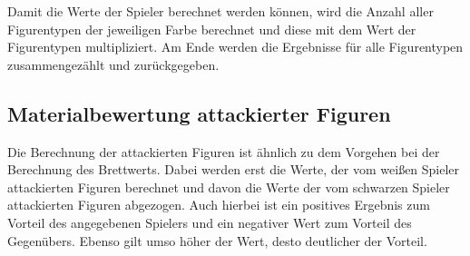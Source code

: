 Damit die Werte der Spieler berechnet werden können, wird die Anzahl
aller Figurentypen der jeweiligen Farbe berechnet und diese mit dem Wert
der Figurentypen multipliziert. Am Ende werden die Ergebnisse für alle
Figurentypen zusammengezählt und zurückgegeben.

    \subsection{Materialbewertung attackierter
Figuren}\label{materialbewertung-attackierter-figuren}

Die Berechnung der attackierten Figuren ist ähnlich zu dem Vorgehen bei
der Berechnung des Brettwerts. Dabei werden erst die Werte, der vom
weißen Spieler attackierten Figuren berechnet und davon die Werte der
vom schwarzen Spieler attackierten Figuren abgezogen. Auch hierbei ist
ein positives Ergebnis zum Vorteil des angegebenen Spielers und ein
negativer Wert zum Vorteil des Gegenübers. Ebenso gilt umso höher der
Wert, desto deutlicher der Vorteil.

